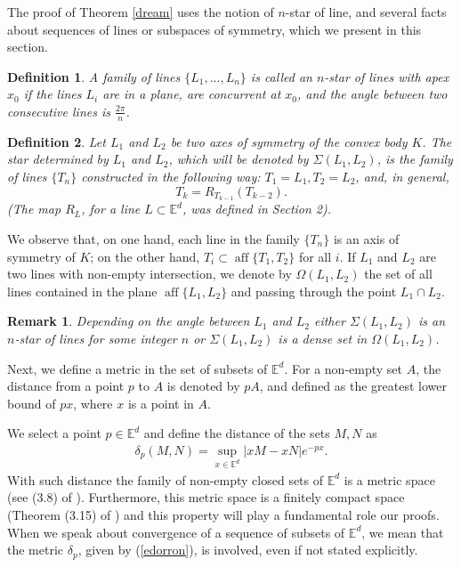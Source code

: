\documentclass[12pt,thmsa]{amsart}
\newcommand{\Ed}{\mathbb{E}^{d}}
\newcommand{\aff}{\operatorname*{aff}}
\newtheorem{remark}{Remark}
\newtheorem{definition}{Definition}
\begin{document}
The proof of Theorem \ref{dream} uses the notion of $n$-star of line, and several facts about sequences of lines or subspaces of symmetry, which we present in this section. 


\begin{definition}
A family of lines $\{L_1,\ldots, L_n\}$ is called  an $n$-star of lines with apex $x_0$ if the lines $L_i$ are in a plane, are concurrent at $x_0$, and the angle between two consecutive lines is $\frac{2\pi}{n}$.  
\end{definition}
\begin{definition}
Let $L_1$ and $L_2$ be two axes of symmetry of the convex body $K$. The star determined by $L_1$ and $L_2$, which will be denoted by $\Sigma (L_1,L_2)$, is the family of lines  
$\{T_n\}$ constructed in the following way: $T_1=L_1, T_2=L_2$, and, in general,
\[
 T_k=R_{T_{k-1}}(T_{k-2}).
\]
(The map $R_{L}$, for a line $L\subset \Ed$, was defined in Section 2).
  \end{definition}
We observe that, on one hand, each line in the family $\{T_n\}$ is an axis of symmetry of $K$; on the other hand, $T_i\subset \aff\{T_1,T_2\}$ for all $i$. 
If $L_1$ and $L_2$ are two lines with non-empty intersection, we denote by $\Omega (L_1,L_2)$  the set of all lines contained in the plane $\aff \{L_1,L_2\}$ and passing through the point  
$L_1\cap L_2$. 
\begin{remark}\label{escandalo}
Depending on the angle between $L_1$ and $L_2$ either  $\Sigma (L_1,L_2)$ is an  
$n$-star of lines for some integer $n$ or $\Sigma (L_1,L_2)$ is a dense set in 
$\Omega (L_1,L_2)$.
\end{remark}

Next, we define a metric in the set of subsets of $\Ed$. For a  non-empty set $A$, the distance from a point $p$ to $A$ is denoted by $pA$, and defined as the greatest lower bound of $px$, where $x$ is a point in $A$. 

We select a point $p \in \Ed$ and define the distance of the sets $M,N$ as 
\begin{eqnarray}\label{edorron}
\delta_p(M,N)=\sup_{x\in \Ed}|  xM-xN |e^{-px}.
\end{eqnarray}
With such distance the family of non-empty closed sets of $\Ed$ is a metric space (see (3.8) of \cite{bu}). Furthermore, this metric space is a finitely compact space (Theorem (3.15) of \cite{bu}) and this  property will play a fundamental role our proofs. %
When we speak about convergence of a sequence of subsets of $\Ed$, we mean  that the metric $\delta_p$, given by (\ref{edorron}), is involved, even if not stated explicitly.
\end{document}
